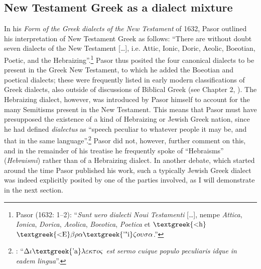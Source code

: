 \subsection{New Testament Greek as a dialect mixture}
\hypertarget{Toc19704831}{}
In his \textit{Form} \textit{of} \textit{the} \textit{Greek} \textit{dialects} \textit{of} \textit{the} \textit{New} \textit{Testament} of 1632, Pasor outlined his interpretation of New Testament Greek as follows: “There are without doubt seven dialects of the New Testament […], i.e. Attic, Ionic, Doric, Aeolic, Boeotian, Poetic, and the Hebraizing”.\footnote{Pasor (1632: 1–2): “\textit{Sunt} \textit{uero} \textit{dialecti} \textit{Noui} \textit{Testamenti} […], nempe \textit{Attica}, \textit{Ionica}, \textit{Dorica}, \textit{Aeolica}, \textit{Boeotica}, \textit{Poetica} et $\text{\textgreek{<h}}$ $\text{\textgreek{<E}}\beta \rho \alpha \text{\textgreek{'"i}}\zeta o\upsilon \sigma \alpha $.”} Pasor thus posited the four canonical dialects to be present in the Greek New Testament, to which he added the Boeotian and poetical dialects; these were frequently listed in early modern classifications of Greek dialects, also outside of discussions of Biblical Greek (see Chapter 2, ). The Hebraizing dialect, however, was introduced by Pasor himself to account for the many Semitisms present in the New Testament. This means that Pasor must have presupposed the existence of a kind of Hebraizing or Jewish Greek nation, since he had defined \textit{dialectus} as “speech peculiar to whatever people it may be, and that in the same language”.\footnote{\citet[1]{Pasor1632}: “$\Delta \iota \text{\textgreek{'a}}\lambda \varepsilon \kappa \tau o\varsigma $ \textit{est} \textit{sermo} \textit{cuique} \textit{populo} \textit{peculiaris} \textit{idque} \textit{in} \textit{eadem} \textit{lingua}”.} Pasor did not, however, further comment on this, and in the remainder of his treatise he frequently spoke of “Hebraisms” (\textit{Hebraismi}) rather than of a Hebraizing dialect. In another debate, which started around the time Pasor published his work, such a typically Jewish Greek dialect was indeed explicitly posited by one of the parties involved, as I will demonstrate in the next section.

